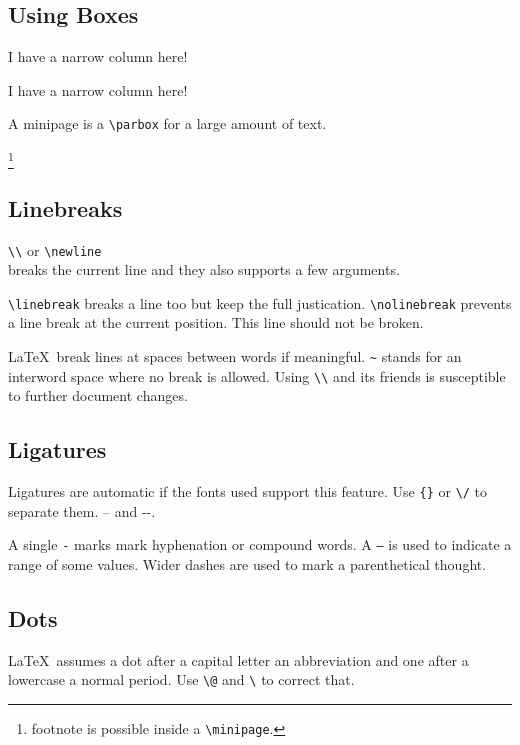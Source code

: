 \documentclass[a4paper,12pt]{article}
\newcommand{\code}[1]{\texttt{#1}}
\begin{document}
\subsection[Boxes]{Using Boxes}

\parbox[t]{1cm}{I have a narrow column here!}
\quad
\parbox[b]{1cm}{I have a narrow column here!}
\quad
\begin{minipage}{3cm}
A minipage is a \code{\textbackslash parbox} for a large amount of text.

\footnote{footnote is possible inside a \code{\textbackslash minipage}.}
\end{minipage}

\subsection{Linebreaks}

\code{\textbackslash\textbackslash} or \code{\textbackslash newline} \\[1cm] breaks the current line and they also supports a few arguments.

\code{\textbackslash linebreak} breaks a line too but keep the full justication. \code{\textbackslash nolinebreak} prevents a line break at the current position. \nolinebreak[4] \linebreak[1]
This line should not be broken.

\LaTeX\ break lines at spaces between words if meaningful. \code{\~} stands for an interword space where no break is allowed. Using \code{\textbackslash\textbackslash} and its friends is susceptible to further document changes.

\subsection{Ligatures}

Ligatures are automatic if the fonts used support this feature. Use \code{\{\}} or \code{\textbackslash/} to separate them. -- and -\/-.

A single \code{-} marks mark hyphenation or compound words. A \code{--} is used to indicate a range of some values. Wider dashes are used to mark a parenthetical thought.

\subsection{Dots}

\LaTeX\ assumes a dot after a capital letter an abbreviation and one after a lowercase a normal period. Use \code{\textbackslash @} and \code{\textbackslash } to correct that.
\end{document}
